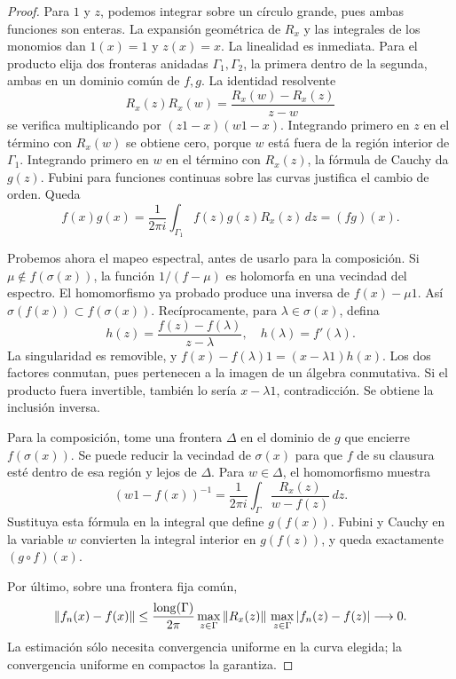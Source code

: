 \begin{proof}
Para $1$ y $z$, podemos integrar sobre un círculo grande, pues ambas funciones son enteras. La expansión geométrica de $R_x$ y las integrales de los monomios dan $1(x)=1$ y $z(x)=x$. La linealidad es inmediata. Para el producto elija dos fronteras anidadas $\Gamma_1,\Gamma_2$, la primera dentro de la segunda, ambas en un dominio común de $f,g$. La identidad resolvente
\[
 R_x(z)R_x(w)=\frac{R_x(w)-R_x(z)}{z-w}
\]
se verifica multiplicando por $(z1-x)(w1-x)$. Integrando primero en $z$ en el término con $R_x(w)$ se obtiene cero, porque $w$ está fuera de la región interior de $\Gamma_1$. Integrando primero en $w$ en el término con $R_x(z)$, la fórmula de Cauchy da $g(z)$. Fubini para funciones continuas sobre las curvas justifica el cambio de orden. Queda
\[
 f(x)g(x)=\frac1{2\pi i}\int_{\Gamma_1}f(z)g(z)R_x(z)\,dz=(fg)(x).
\]

Probemos ahora el mapeo espectral, antes de usarlo para la composición. Si $\mu\notin f(\sigma(x))$, la función $1/(f-\mu)$ es holomorfa en una vecindad del espectro. El homomorfismo ya probado produce una inversa de $f(x)-\mu1$. Así $\sigma(f(x))\subset f(\sigma(x))$. Recíprocamente, para $\lambda\in\sigma(x)$, defina
\[
 h(z)=\frac{f(z)-f(\lambda)}{z-\lambda},\quad h(\lambda)=f'(\lambda).
\]
La singularidad es removible, y $f(x)-f(\lambda)1=(x-\lambda1)h(x)$. Los dos factores conmutan, pues pertenecen a la imagen de un álgebra conmutativa. Si el producto fuera invertible, también lo sería $x-\lambda1$, contradicción. Se obtiene la inclusión inversa.

Para la composición, tome una frontera $\Delta$ en el dominio de $g$ que encierre $f(\sigma(x))$. Se puede reducir la vecindad de $\sigma(x)$ para que $f$ de su clausura esté dentro de esa región y lejos de $\Delta$. Para $w\in\Delta$, el homomorfismo muestra
\[
 (w1-f(x))^{-1}=\frac1{2\pi i}\int_\Gamma
 \frac{R_x(z)}{w-f(z)}\,dz.
\]
Sustituya esta fórmula en la integral que define $g(f(x))$. Fubini y Cauchy en la variable $w$ convierten la integral interior en $g(f(z))$, y queda exactamente $(g\circ f)(x)$.

Por último, sobre una frontera fija común,
\[
 \left\lVert f_n(x)-f(x)\right\rVert\le
 \frac{\operatorname{long}(\Gamma)}{2\pi}
 \max_{z\in\Gamma}\left\lVert R_x(z)\right\rVert\,
 \max_{z\in\Gamma}|f_n(z)-f(z)|\longrightarrow0.
\]
La estimación sólo necesita convergencia uniforme en la curva elegida; la convergencia uniforme en compactos la garantiza.
\end{proof}

